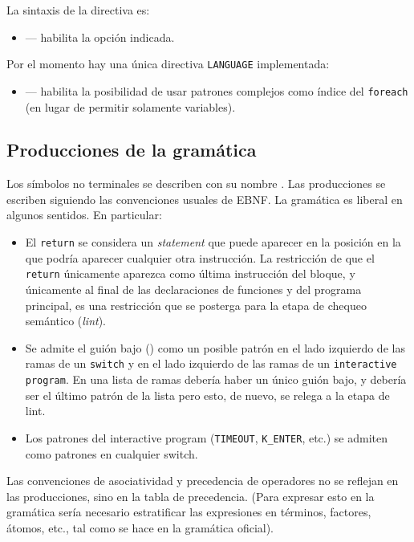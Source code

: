 \documentclass{article}
\begin{document}
La sintaxis de la directiva es:
\begin{itemize}
\item {} ---
      habilita la opci\'on indicada.
\end{itemize}

Por el momento hay una \'unica directiva \texttt{LANGUAGE} implementada:
\begin{itemize}
\item {} ---
      habilita la posibilidad de usar patrones complejos
      como \'indice del \texttt{foreach}
      (en lugar de permitir solamente variables).
\end{itemize}

\subsection{Producciones de la gram\'atica}

Los s\'imbolos no terminales se describen con su nombre .
Las producciones se escriben siguiendo las convenciones usuales de EBNF.
La gram\'atica es liberal en algunos sentidos. En particular:
\begin{itemize}
\item El \texttt{return}
se considera un {\em statement} que puede aparecer en la posici\'on en la que
podr\'ia aparecer cualquier otra instrucci\'on. La restricci\'on de que
el \texttt{return} \'unicamente aparezca como \'ultima instrucci\'on del bloque, y
\'unicamente al final de las declaraciones de funciones y del programa principal,
es una restricci\'on que se posterga para la etapa de chequeo sem\'antico
({\em lint}).
\item Se admite el gui\'on bajo (\chr{\_}) como un posible patr\'on en el lado
izquierdo de las ramas de un \texttt{switch} y en el lado izquierdo de las ramas de un
\texttt{interactive program}.
En una lista de ramas deber\'ia haber un \'unico gui\'on bajo, y deber\'ia ser el \'ultimo
patr\'on de la lista pero esto, de nuevo, se relega a la etapa de lint.
\item Los patrones del interactive program (\texttt{TIMEOUT}, \texttt{K\_ENTER}, etc.) se
admiten como patrones en cualquier switch.
\end{itemize}

Las convenciones de asociatividad y precedencia de operadores no se reflejan
en las producciones, sino en la tabla de precedencia.
(Para expresar esto en la gram\'atica ser\'ia necesario estratificar las expresiones
en t\'erminos, factores, \'atomos, etc., tal como se hace en la gram\'atica oficial).
\bigskip
\end{document}
